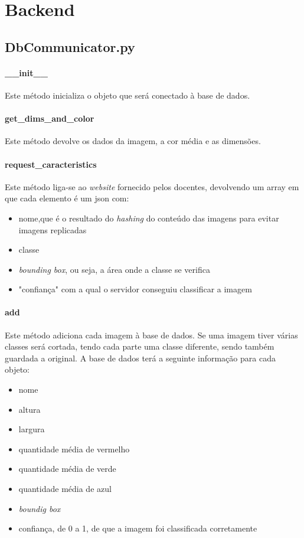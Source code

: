 \documentclass{report}
\begin{document}
\section{Backend}
\subsection{DbCommunicator.py}
\paragraph{\_\_init\_\_}
Este método inicializa o objeto que será conectado à base de dados.

\paragraph{get\_dims\_and\_color}
Este método devolve os dados da imagem, a cor média e as dimensões. 

\paragraph{request\_caracteristics}
Este método liga-se ao \textit{website} fornecido pelos docentes, devolvendo um array em que cada elemento é um json com:
\begin{itemize}
\item nome,que é o resultado do \textit{hashing} do conteúdo das imagens para evitar imagens replicadas
\item classe
\item \textit{bounding box}, ou seja, a área onde a classe se verifica
\item "confiança" com a qual o servidor conseguiu classificar a imagem
\end{itemize}

\paragraph{add}
Este método adiciona cada imagem à base de dados. Se uma imagem tiver várias classes será  cortada, tendo cada parte  uma classe diferente, sendo também guardada a original. A base de dados terá a seguinte informação para cada objeto:
\begin{itemize}
\item nome
\item altura
\item largura
\item quantidade média de vermelho
\item quantidade média de verde
\item quantidade média de azul
\item \textit{boundig box}
\item confiança, de 0 a 1, de que a imagem foi classificada corretamente
\end{itemize}
\end{document}

